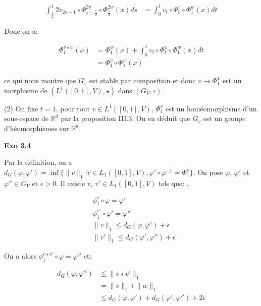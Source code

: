 \documentclass[11pt]{article}
\begin{document}
    \vspace{-4em}
    \begin{align*}
      \int_{\frac{1}{2}}^1 2v_{2s-1} \circ  \Phi_{s-\frac{1}{2}}^{2v} \circ \Phi_{\frac{1}{2}}^{2w} (x) ds &= \int_0^1 v_t \circ \Phi^v_t \circ \Phi_1^w (x) dt
    \end{align*}
    \vspace{-4em}

    Donc on a:

    \vspace{-4em}
    \begin{align*}
      \Phi_1^{v \star w} (x) &= \Phi_1^w (x) + \int_0^1 v_t \circ \Phi^v_t \circ \Phi_1^w (x) dt \\
      &= \Phi_1^v \circ \Phi_1^w (x) 
    \end{align*}
    \vspace{-4em}

    ce qui nous montre que $G_v$ est stable par composition et donc $v \to \Phi_1^V$ est un morphisme de $(L^1([0, 1], V), \star)$ dans $(G_V, \circ)$.

    (2) On fixe $t = 1$, pour tout $v \in L^1 ([0, 1], V)$, $\Phi_1^v$ est un homéomorphisme d'un sous-espace de $\mathbb{R}^d$ par la proposition III.3. 
    On en déduit que $G_v$ est un groupe d'héomorphismes sur $\mathbb{R}^d$.

    \textbf{Exo 3.4}

    Par la définition, on a $d_G (\varphi, \varphi') = \inf\{\|v\|_1 | v \in L_1 ([0, 1], V),  \varphi' \circ \varphi^{-1} = \Phi_1^v\}$. 
    On pose $\varphi$, $\varphi'$ et $\varphi'' \in G_V$ et $\epsilon > 0$. 
    Il existe $v$, $v' \in L_1([0, 1],V)$ tels que: .

    \vspace{-5em}
    \begin{align*}
      &\phi_1^{v} \circ \varphi = \varphi' \\
      & \phi_1^{v'} \circ \varphi' = \varphi'' \\
      &\|v\|_1 \le d_G (\varphi, \varphi') + \epsilon \\
      & \|v'\|_1 \le d_G (\varphi', \varphi'') + \epsilon
    \end{align*}
    \vspace{-4em}


    On a alors $\phi_1^{v \star v'} \circ \varphi = \varphi''$ et:

    \vspace{-4em}
    \begin{align*}
      d_G(\varphi, \varphi'') &\le \|v \star v'\|_1 \\
      &= \|v\|_1 + \|w\|_1 \\
      &\le d_G(\varphi, \varphi') + d_G(\varphi', \varphi'') + 2 \epsilon
    \end{align*}
    \vspace{-4em}
\end{document}
